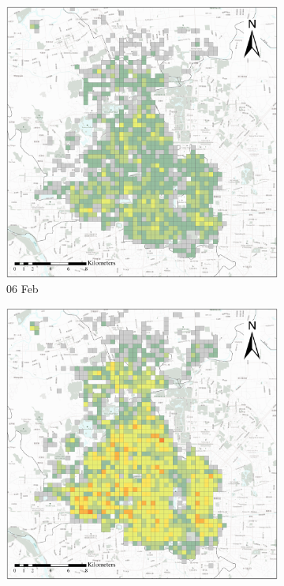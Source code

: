 \documentclass[preprints,article,accept,moreauthors,pdftex]{Definitions/mdpi}
\begin{document}
\begin{figure}[ht]
    \vspace{6pt}
    \begin{subfigure}{.23\textwidth}
        \includegraphics[width=\textwidth]{Figures/Overall_spatial_patterns/FN5_D2020_02_06.eps}
        \caption{06 Feb}
    \end{subfigure}
    \begin{subfigure}{.23\textwidth}
        \includegraphics[width=\textwidth]{Figures/Overall_spatial_patterns/FN5_D2020_02_10.eps}

\end{subfigure}
\end{figure}
\end{document}
